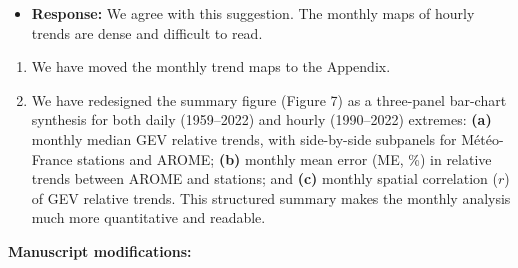 \documentclass[
  letterpaper,
  DIV=11,
  numbers=noendperiod]{scrartcl}
\providecommand{\tightlist}{%
  \setlength{\itemsep}{0pt}\setlength{\parskip}{0pt}}\usepackage{longtable,booktabs,array}
\begin{document}
\begin{itemize}
\tightlist
\item
  \textbf{Response:} We agree with this suggestion. The monthly maps of
  hourly trends are dense and difficult to read.
\end{itemize}

\begin{enumerate}
\def\labelenumi{\arabic{enumi}.}
\item
  We have moved the monthly trend maps to the Appendix.
\item
  We have redesigned the summary figure (Figure 7) as a three-panel
  bar-chart synthesis for both daily (1959--2022) and hourly
  (1990--2022) extremes: \textbf{(a)} monthly median GEV relative
  trends, with side-by-side subpanels for Météo-France stations and
  AROME; \textbf{(b)} monthly mean error (ME, \%) in relative trends
  between AROME and stations; and \textbf{(c)} monthly spatial
  correlation (\(r\)) of GEV relative trends. This structured summary
  makes the monthly analysis much more quantitative and readable.
\end{enumerate}

\textbf{Manuscript modifications:}
\end{document}
